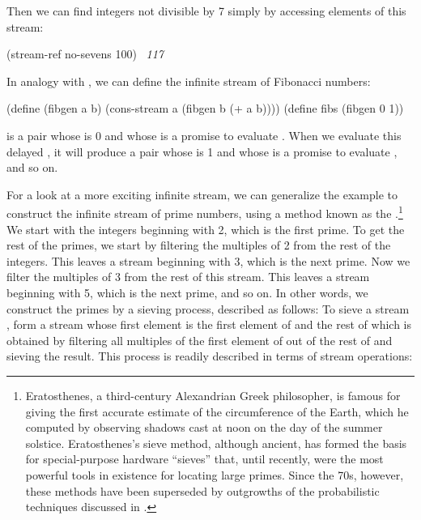 \noindent
Then we can find integers not divisible by 7 simply by accessing elements of
this stream:

\begin{codeBlock}
(stream-ref no-sevens 100)
~\textit{117}~
\end{codeBlock}

\noindent
In analogy with , we can define the infinite stream of Fibonacci
numbers:

\begin{codeBlock}
(define (fibgen a b) (cons-stream a (fibgen b (+ a b))))
(define fibs (fibgen 0 1))
\end{codeBlock}

\noindent
{} is a pair whose  is 0 and whose  is a promise
to evaluate .  When we evaluate this delayed , it will produce a pair whose  is 1 and whose  is a
promise to evaluate , and so on.

For a look at a more exciting infinite stream, we can generalize the
 example to construct the infinite stream of prime numbers,
using a method known as the .\footnote{Eratosthenes, a third-century 
Alexandrian Greek philosopher, is famous for giving the first accurate estimate
of the circumference of the Earth, which he computed by observing shadows cast
at noon on the day of the summer solstice.  Eratosthenes's sieve method,
although ancient, has formed the basis for special-purpose hardware ``sieves''
that, until recently, were the most powerful tools in existence for locating
large primes.  Since the 70s, however, these methods have been superseded by
outgrowths of the probabilistic techniques discussed in .}
We start with the integers beginning with 2, which is the first prime.  To get
the rest of the primes, we start by filtering the multiples of 2 from the rest
of the integers.  This leaves a stream beginning with 3, which is the next
prime.  Now we filter the multiples of 3 from the rest of this stream.  This
leaves a stream beginning with 5, which is the next prime, and so on.  In other
words, we construct the primes by a sieving process, described as follows: To
sieve a stream , form a stream whose first element is the first element
of  and the rest of which is obtained by filtering all multiples of the
first element of  out of the rest of  and sieving the
result. This process is readily described in terms of stream operations:


